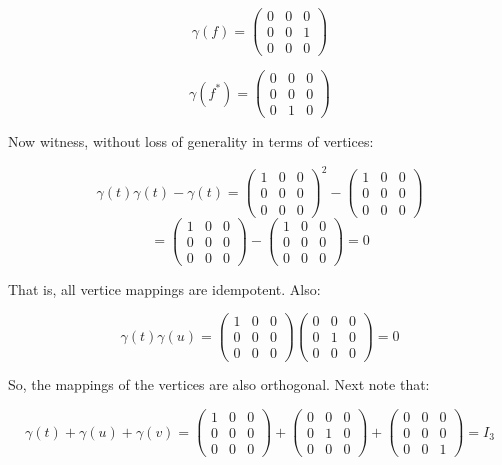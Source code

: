 \begin{solution}
    $$\gamma(f)=\left(\begin{array}{ccc} 0 & 0 & 0 \\ 0 & 0 & 1 \\ 0 & 0 & 0 \end{array}\right)$$

    $$\gamma(f^*)=\left(\begin{array}{ccc} 0 & 0 & 0 \\ 0 & 0 & 0 \\ 0 & 1 & 0 \end{array}\right)$$

    Now witness, without loss of generality in terms of vertices:

    $$\gamma(t)\gamma(t)-\gamma(t)
    =\left(\begin{array}{ccc} 1 & 0 & 0 \\ 0 & 0 & 0 \\ 0 & 0 & 0 \end{array}\right)^2
    -\left(\begin{array}{ccc} 1 & 0 & 0 \\ 0 & 0 & 0 \\ 0 & 0 & 0 \end{array}\right)$$
    $$=\left(\begin{array}{ccc} 1 & 0 & 0 \\ 0 & 0 & 0 \\ 0 & 0 & 0 \end{array}\right)-
    \left(\begin{array}{ccc} 1 & 0 & 0 \\ 0 & 0 & 0 \\ 0 & 0 & 0 \end{array}\right)=0$$

    That is, all vertice mappings are idempotent. Also:

    $$\gamma(t)\gamma(u)=\left(\begin{array}{ccc} 1 & 0 & 0 \\ 0 & 0 & 0 \\ 0 & 0 & 0 \end{array}\right)
    \left(\begin{array}{ccc} 0 & 0 & 0 \\ 0 & 1 & 0 \\ 0 & 0 & 0 \end{array}\right)=0$$

    So, the mappings of the vertices are also orthogonal. Next note that:

    $$\gamma(t)+\gamma(u)+\gamma(v)=
    \left(\begin{array}{ccc} 1 & 0 & 0 \\ 0 & 0 & 0 \\ 0 & 0 & 0 \end{array}\right)
    +\left(\begin{array}{ccc} 0 & 0 & 0 \\ 0 & 1 & 0 \\ 0 & 0 & 0 \end{array}\right)
    +\left(\begin{array}{ccc} 0 & 0 & 0 \\ 0 & 0 & 0 \\ 0 & 0 & 1 \end{array}\right)=I_3$$


\end{solution}
